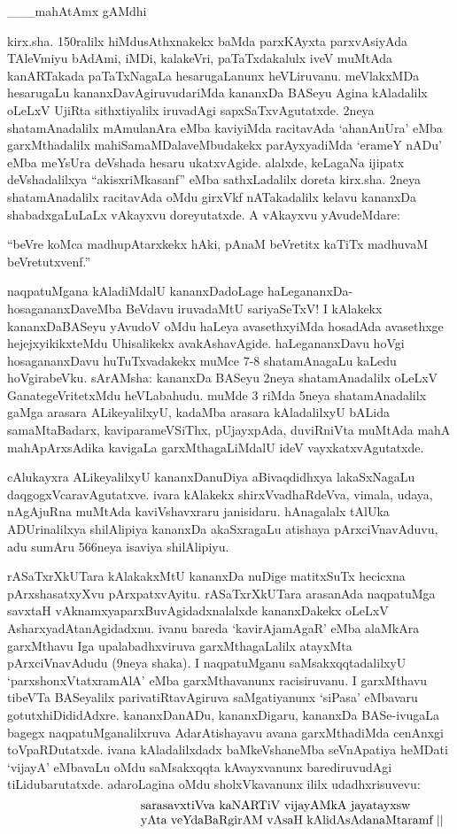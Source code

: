 \documentclass[11pt,a4size]{article}
\begin{document}
\hfill\_\_\_mahAtAmx gAMdhi

\medskip
kirx.sha. 150ralilx hiMdusAthxnakekx baMda parxKAyxta parxvAsiyAda
TAleVmiyu bAdAmi, iMDi, kalakeVri, paTaTxdakalulx iveV muMtAda
kanARTakada paTaTxNagaLa hesarugaLanunx heVLiruvanu. meVlakxMDa
hesarugaLu kananxDavAgiruvudariMda kananxDa BASeyu Agina kAladalilx
oLeLxV UjiRta sithxtiyalilx iruvadAgi sapxSaTxvAgutatxde. 2neya
shatamAnadalilx mAmulanAra eMba kaviyiMda racitavAda `ahanAnUra' eMba
garxMthadalilx mahiSamaMDalaveMbudakekx parAyxyadiMda `erameY nADu'
eMba meYsUra deVshada hesaru ukatxvAgide. alalxde, keLagaNa ijipatx
deVshadalilxya ``akisxriMkasanf'' eMba sathxLadalilx doreta
kirx.sha. 2neya shatamAnadalilx racitavAda oMdu girxVkf nATakadalilx
kelavu kananxDa shabadxgaLuLaLx vAkayxvu doreyutatxde. A vAkayxvu
yAvudeMdare:

``beVre koMca madhupAtarxkekx hAki, pAnaM beVretitx kaTiTx madhuvaM
beVretutxvenf.''

naqpatuMgana kAladiMdalU kananxDadoLage haLegananxDa-hosagananxDaveMba
BeVdavu iruvadaMtU sariyaSeTxV! I kAlakekx kananxDaBASeyu yAvudoV oMdu
haLeya avasethxyiMda hosadAda avasethxge hejejxyikikxteMdu Uhisalikekx
avakAshavAgide. haLegananxDavu hoVgi hosagananxDavu huTuTxvadakekx
muMce 7-8 shatamAnagaLu kaLedu hoVgirabeVku. sArAMsha: kananxDa BASeyu
2neya shatamAnadalilx oLeLxV GanategeVritetxMdu heVLabahudu. muMde 3
riMda 5neya shatamAnadalilx gaMga arasara ALikeyalilxyU, kadaMba
arasara kAladalilxyU bALida samaMtaBadarx, kaviparameVSiThx,
pUjayxpAda, duviRniVta muMtAda mahA mahApArxsAdika kavigaLa
garxMthagaLiMdalU ideV vayxkatxvAgutatxde.

cAlukayxra ALikeyalilxyU kananxDanuDiya aBivaqdidhxya lakaSxNagaLu
daqgogxVcaravAgutatxve. ivara kAlakekx shirxVvadhaRdeVva, vimala,
udaya, nAgAjuRna muMtAda kaviVshavxraru janisidaru. hAnagalalx tAlUka
ADUrinalilxya shilAlipiya kananxDa akaSxragaLu atishaya
pArxciVnavAduvu, adu sumAru 566neya isaviya shilAlipiyu.

rASaTxrXkUTara kAlakakxMtU kananxDa nuDige matitxSuTx hecicxna
pArxshasatxyXvu pArxpatxvAyitu. rASaTxrXkUTara arasanAda naqpatuMga
savxtaH vAknamxyaparxBuvAgidadxnalalxde kananxDakekx oLeLxV
AsharxyadAtanAgidadxnu. ivanu bareda `kavirAjamAgaR' eMba alaMkAra
garxMthavu Iga upalabadhxviruva garxMthagaLalilx atayxMta
pArxciVnavAdudu (9neya shaka). I naqpatuMganu saMsakxqqtadalilxyU
`parxshonxVtatxramAlA' eMba garxMthavanunx racisiruvanu. I garxMthavu
tibeVTa BASeyalilx parivatiRtavAgiruva saMgatiyanunx `siPasa' eMbavaru
gotutxhiDididAdxre. kananxDanADu, kananxDigaru, kananxDa BASe-ivugaLa
bagegx naqpatuMganalilxruva AdarAtishayavu avana garxMthadiMda
cenAnxgi toVpaRDutatxde. ivana kAladalilxdadx baMkeVshaneMba
seVnApatiya heMDati `vijayA' eMbavaLu oMdu saMsakxqqta kAvayxvanunx
barediruvudAgi tiLidubarutatxde. adaroLagina oMdu sholxVkavanunx ililx
udadhxrisuvevu:
$$
\vbox{\parskip=0pt\parindent=0pt \everypar{\hskip10em} \obeylines
sarasavxtiVva kaNARTiV vijayAMkA jayatayxsw
yAta veYdaBaRgirAM vAsaH kAlidAsAdanaMtaramf ||}
$$
 
\end{document}
